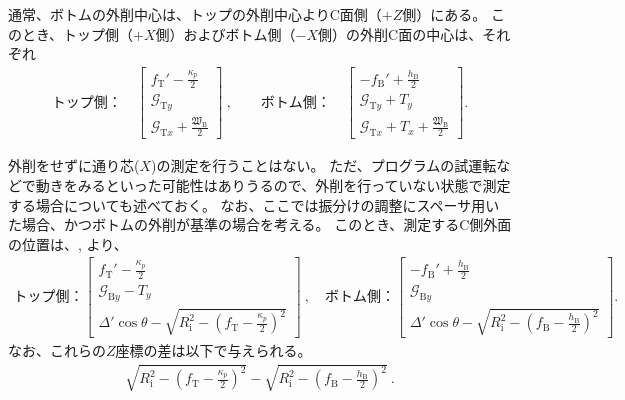 通常、ボトムの外削中心は、トップの外削中心よりC面側（$+Z$側）にある。
このとき、トップ側（$+X$側）およびボトム側（$-X$側）の外削C面の中心は、それぞれ
\begin{align*}
  \text{トップ側：}\quad
  \left[
    \begin{array}{c}
      \displaystyle f_\mathrm T'-\frac{\kappa_p}2\\[5pt]
      \mathcal G_{\mathrm Ty}\\[3pt]
      \displaystyle \mathcal G_{\mathrm Tx}+\frac{\mathfrak W_\mathrm B}2
    \end{array}
    \right]~, \qquad
  \text{ボトム側：}\quad
  \left[
    \begin{array}{c}
      \displaystyle -f_\mathrm B'+\frac{h_\mathrm B}2\\[5pt]
      \mathcal G_{\mathrm Ty}+T_y\\[3pt]
      \displaystyle \mathcal G_{\mathrm Tx}+T_x+\frac{\mathfrak W_\mathrm B}2
    \end{array}
  \right].
\end{align*}



\clearpage
外削をせずに通り芯($X$)の測定を行うことはない。
ただ、プログラムの試運転などで動きをみるといった可能性はありうるので、外削を行っていない状態で測定する場合についても述べておく。
なお、ここでは振分けの調整にスペーサ用いた場合、かつボトムの外削が基準の場合を考える。
このとき、測定するC側外面の位置は、, より、
\begin{align*}
  \text{トップ側：}
  \left[
    \begin{array}{c}
      \displaystyle f_\mathrm T'-\frac{\kappa_p}2\\[5pt]
      \mathcal G_{\mathrm By}-T_y\\[3pt]
      \displaystyle \varDelta'\!\cos\theta-\sqrt{R_\mathrm i^2-\left(f_\mathrm T-\frac{\kappa_p}2\right)^{\!\!2}}
    \end{array}
  \right]~, \quad
  \text{ボトム側：}
  \left[
    \begin{array}{c}
      \displaystyle -f_\mathrm B'+\frac{h_\mathrm B}2\\[5pt]
      \mathcal G_{\mathrm By}\\[3pt]
      \displaystyle \varDelta'\!\cos\theta-\sqrt{R_\mathrm i^2-\left(f_\mathrm B-\frac{h_\mathrm B}2\right)^{\!\!2}}
    \end{array}
    \right].
\end{align*}
なお、これらの$Z$座標の差は以下で与えられる。
\begin{align*}
  \sqrt{R_\mathrm i^2-\left(f_\mathrm T-\frac{\kappa_p}2\right)^{\!\!2}}
  -\sqrt{R_\mathrm i^2-\left(f_\mathrm B-\frac{h_\mathrm B}2\right)^{\!\!2}}~.
\end{align*}
